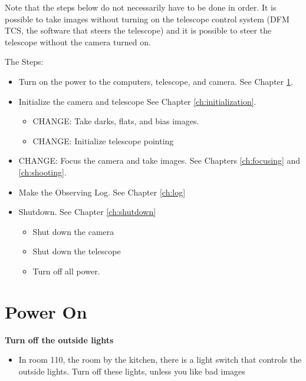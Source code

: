\documentclass[letterpaper, 12pt]{report}
\begin{document}
Note that the steps below do not necessarily have to be done in order. It is possible to take images without turning on the telescope control system (DFM TCS, the software that steers the telescope) and it is possible to steer the telescope without the camera turned on.

The Steps:
\begin{itemize}
	\item Turn on the power to the computers, telescope, and camera. See Chapter \ref{ch:power}.
	\item Initialize the camera and telescope See Chapter \ref{ch:initialization}.
	\begin{itemize}
		\item CHANGE: Take darks, flats, and bias images.
		\item CHANGE: Initialize telescope pointing
	\end{itemize}
	\item CHANGE: Focus the camera and take images. See Chapters \ref{ch:focusing} and \ref{ch:shooting}.
	\item Make the Observing Log. See Chapter \ref{ch:log}
	\item Shutdown. See Chapter \ref{ch:shutdown}
	\begin{itemize}
		\item Shut down the camera
		\item Shut down the telescope
		\item Turn off all power.
	\end{itemize}
\end{itemize}

\newpage

\chapter{Power On}\label{ch:power}

\textbf{Turn off the outside lights}
\begin{itemize}
	\item In room 110, the room by the kitchen, there is a light switch that controls the outside lights. Turn off these lights, unless you like bad images
\end{itemize}
\end{document}
